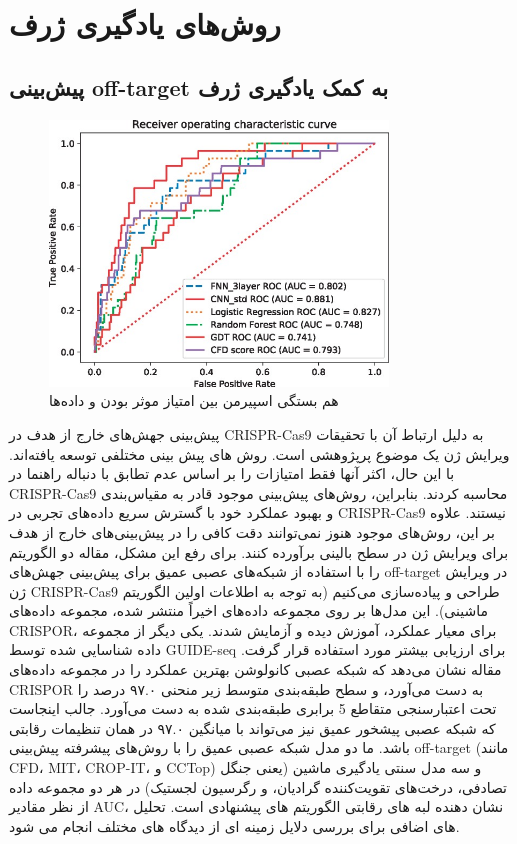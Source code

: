 \documentclass[12pt,a4paper,BCOR=.7cm,headsepline,bibliography=totoc]{report}
\begin{document}
\section{روش‌های یادگیری ژرف}
\subsection{پیش‌بینی off-target به کمک یادگیری ژرف}
\begin{figure}
\centering
\includegraphics[width=9cm, ]{pictures/DeepLearning.jpg}
\caption{
هم بستگی اسپیرمن بین امتیاز موثر بودن و داده‌ها ~\cite{chart}
}\label{wrap-fig:4}
\end{figure}
پیش‌بینی جهش‌های خارج از هدف در CRISPR-Cas9 به دلیل ارتباط آن با تحقیقات ویرایش ژن یک موضوع پرپژوهشی است. روش های پیش بینی مختلفی توسعه یافته‌اند. با این حال، اکثر آنها فقط امتیازات را بر اساس عدم تطابق با دنباله راهنما در CRISPR-Cas9 محاسبه کردند. بنابراین، روش‌های پیش‌بینی موجود قادر به مقیاس‌بندی و بهبود عملکرد خود با گسترش سریع داده‌های تجربی در CRISPR-Cas9 نیستند. علاوه بر این، روش‌های موجود هنوز نمی‌توانند دقت کافی را در پیش‌بینی‌های خارج از هدف برای ویرایش ژن در سطح بالینی برآورده کنند. برای رفع این مشکل، مقاله دو الگوریتم را با استفاده از شبکه‌های عصبی عمیق برای پیش‌بینی جهش‌های off-target در ویرایش ژن CRISPR-Cas9 طراحی و پیاده‌سازی می‌کنیم (به توجه به اطلاعات اولین الگوریتم ماشینی). این مدل‌ها بر روی مجموعه داده‌های اخیراً منتشر شده، مجموعه داده‌های CRISPOR، برای معیار عملکرد، آموزش دیده و آزمایش شدند. یکی دیگر از مجموعه داده شناسایی شده توسط GUIDE-seq برای ارزیابی بیشتر مورد استفاده قرار گرفت. مقاله نشان می‌دهد که شبکه عصبی کانولوشن بهترین عملکرد را در مجموعه داده‌های CRISPOR به دست می‌آورد، و سطح طبقه‌بندی متوسط ​​زیر منحنی ۹۷.۰ درصد را تحت اعتبارسنجی متقاطع 5 برابری طبقه‌بندی شده به دست می‌آورد. جالب اینجاست که شبکه عصبی پیشخور عمیق نیز می‌تواند با میانگین ۹۷.۰ در همان تنظیمات رقابتی باشد. ما دو مدل شبکه عصبی عمیق را با روش‌های پیشرفته پیش‌بینی off-target (مانند CFD، MIT، CROP-IT، و CCTop) و سه مدل سنتی یادگیری ماشین (یعنی جنگل تصادفی، درخت‌های تقویت‌کننده گرادیان، و رگرسیون لجستیک) در هر دو مجموعه داده از نظر مقادیر AUC، نشان دهنده لبه های رقابتی الگوریتم های پیشنهادی است. تحلیل های اضافی برای بررسی دلایل زمینه ای از دیدگاه های مختلف انجام می شود.
\end{document}

